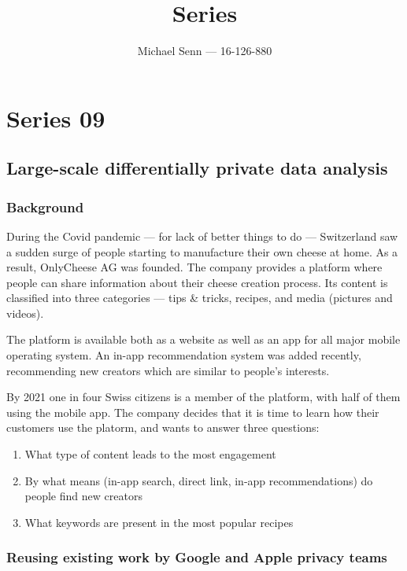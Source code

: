 \documentclass[a4paper]{scrreprt}
\title{Series \series}
\author{Michael Senn \maillink{michael.senn@students.unibe.ch} --- 16-126-880}
\date{\printdate}
\newcommand{\series}{09}
\begin{document}
\maketitle


\setcounter{chapter}{\numexpr \series - 1 \relax}

\chapter{Series \series}

\section{Large-scale differentially private data analysis}

\subsection{Background}

During the Covid pandemic --- for lack of better things to do --- Switzerland
saw a sudden surge of people starting to manufacture their own cheese at home.
As a result, OnlyCheese AG was founded. The company provides a platform where
people can share information about their cheese creation process. Its content
is classified into three categories --- tips \& tricks, recipes, and media
(pictures and videos).

The platform is available both as a website as well as an app for all major
mobile operating system. An in-app recommendation system was added recently,
recommending new creators which are similar to people's interests.

By 2021 one in four Swiss citizens is a member of the platform, with half of
them using the mobile app. The company decides that it is time to learn how
their customers use the platorm, and wants to answer three questions:
\begin{enumerate}
		\item What type of content leads to the most engagement
		\item By what means (in-app search, direct link, in-app
				recommendations) do people find new creators
		\item What keywords are present in the most popular recipes
\end{enumerate}

\subsection{Reusing existing work by Google and Apple privacy teams}
\end{document}
